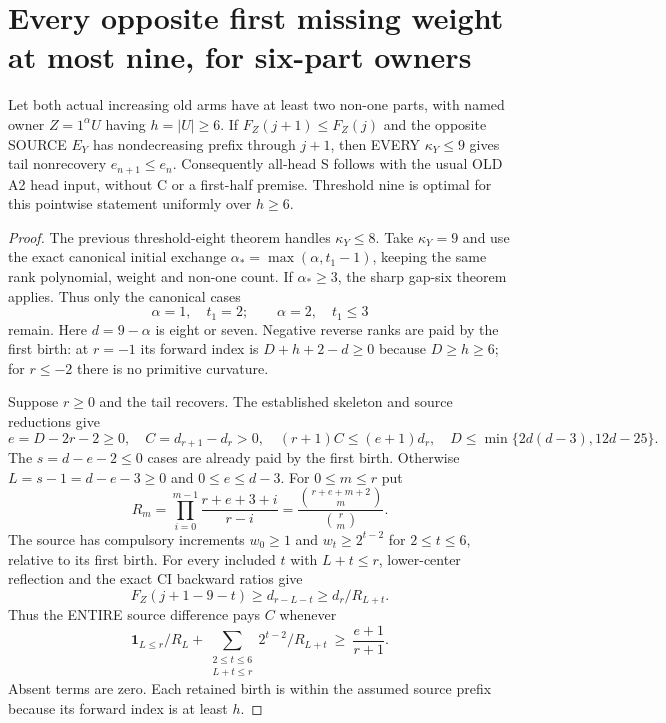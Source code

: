 \section{Every opposite first missing weight at most nine, for six-part owners}
\begin{theorem}
Let both actual increasing old arms have at least two non-one parts,
with named owner $Z=1^\alpha U$ having $h=|U|\ge6$.
If $F_Z(j+1)\le F_Z(j)$ and the opposite SOURCE $E_Y$ has
nondecreasing prefix through $j+1$, then EVERY
$\kappa_Y\le9$ gives tail nonrecovery $e_{n+1}\le e_n$.
Consequently all-head S follows with the usual OLD A2 head input,
without C or a first-half premise. Threshold nine is optimal for
this pointwise statement uniformly over $h\ge6$.
\end{theorem}
\begin{proof}
The previous threshold-eight theorem handles $\kappa_Y\le8$.
Take $\kappa_Y=9$ and use the exact canonical initial exchange
$\alpha_* =\max(\alpha,t_1-1)$, keeping the same rank polynomial,
weight and non-one count. If $\alpha_*\ge3$, the sharp gap-six
theorem applies. Thus only the canonical cases
\[
        \alpha=1,\quad t_1=2;\qquad
        \alpha=2,\quad t_1\le3                         \tag{1}
\]
remain. Here $d=9-\alpha$ is eight or seven.
Negative reverse ranks are paid by the first birth:
at $r=-1$ its forward index is $D+h+2-d\ge0$ because
$D\ge h\ge6$; for $r\le-2$ there is no primitive curvature.

Suppose $r\ge0$ and the tail recovers. The established skeleton
and source reductions give
\[
 e=D-2r-2\ge0,\quad C=d_{r+1}-d_r>0,\quad
 (r+1)C\le(e+1)d_r,
 \quad D\le\min\{2d(d-3),12d-25\}.
\]
The $s=d-e-2\le0$ cases are already paid by the first birth.
Otherwise $L=s-1=d-e-3\ge0$ and $0\le e\le d-3$.
For $0\le m\le r$ put
\[
 R_m=\prod_{i=0}^{m-1}\frac{r+e+3+i}{r-i}
     =\frac{{r+e+m+2\choose m}}{{r\choose m}}.
\]
The source has compulsory increments $w_0\ge1$ and
$w_t\ge2^{t-2}$ for $2\le t\le6$, relative to its first birth.
For every included $t$ with $L+t\le r$, lower-center reflection
and the exact CI backward ratios give
\[
 F_Z(j+1-9-t)\ge d_{r-L-t}\ge d_r/R_{L+t}.
\]
Thus the ENTIRE source difference pays $C$ whenever
\[
 \mathbf1_{L\le r}/R_L+
 \sum_{\substack{2\le t\le6\\L+t\le r}}
                    2^{t-2}/R_{L+t}\ \ge\ \frac{e+1}{r+1}.       \tag{2}
\]
Absent terms are zero. Each retained birth is within the assumed
source prefix because its forward index is at least $h$.


\end{proof}
